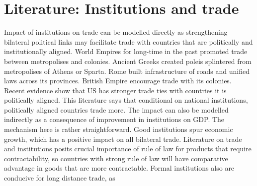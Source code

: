 \section{Literature: Institutions and trade}
Impact of institutions on trade can be modelled directly as strengthening bilateral political links may facilitate trade with countries that are politically and institutionally aligned. World Empires for long-time in the past promoted trade between metropolises and colonies. Ancient Greeks created poleis splintered from metropolises of Athens or Sparta. Rome built infrastructure of roads and unified laws across its provinces. British Empire encourage trade with its colonies. Recent evidence show that US has stronger trade ties with countries it is politically aligned. This literature says that conditional on national institutions, politically aligned countries trade more.
The impact can also be modelled indirectly as a consequence of improvement in institutions on GDP. The mechanism here is rather straightforward. Good institutions spur economic growth, which has a positive impact on all bilateral trade.
Literature on trade and institutions posits crucial importance of rule of law for products that require contractability, so countries with strong rule of law will have comparative advantage in goods that are more contractable.
Formal institutions also are conducive for long distance trade, as 

